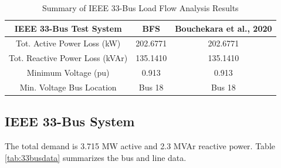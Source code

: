\documentclass[12pt]{article}
\begin{document}
	
	
	
	\begin{table}[htbp]
		\caption{Summary of IEEE 33-Bus Load Flow Analysis Results}
		\begin{center}
			\begin{tabular}{ccc}
				\hline
				\textbf{IEEE 33-Bus Test System} & \textbf{BFS} & \textbf{Bouchekara et al., 2020} \\ \hline
				Tot. Active Power Loss (kW)      & 202.6771     & 202.6771                   \\
				Tot. Reactive Power Loss (kVAr)  & 135.1410     & 135.1410                   \\
				Minimum Voltage (pu)             & 0.913        & 0.913                      \\
				Min. Voltage Bus Location        & Bus 18       & Bus 18                     \\	\hline
			\end{tabular}
			\label{tab:loadflowresult}
		\end{center}
	\end{table}
	
	\subsection{IEEE 33-Bus System}
	The total demand is 3.715 MW active and 2.3 MVAr reactive power. Table \ref{tab:33busdata} summarizes the bus and line data.
	
\end{document}
